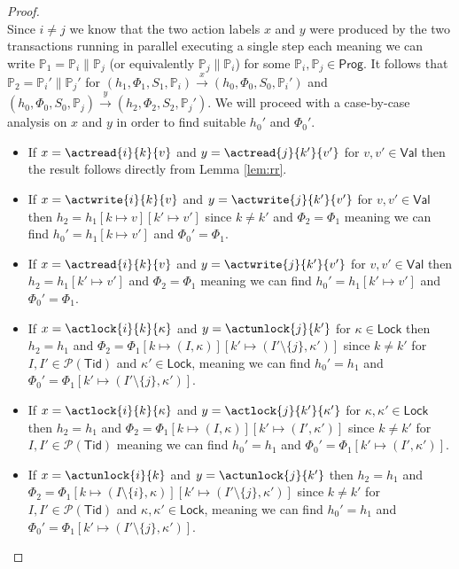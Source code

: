 \begin{lem}
\begin{proof}
\[	\]
	Since $i \neq j$ we know that the two action labels $x$ and $y$ were produced by the two transactions running in parallel executing a single step each meaning we can write $\mathds{P}_1 = \mathds{P}_i \| \mathds{P}_j$ (or equivalently $\mathds{P}_j \| \mathds{P}_i$) for some $\mathds{P}_i, \mathds{P}_j \in \mathsf{Prog}$. It follows that $\mathds{P}_2 = \mathds{P}_i' \| \mathds{P}_j'$ for $(h_1, \Phi_1, S_1, \mathds{P}_i) \xrightarrow{x} (h_0, \Phi_0, S_0, \mathds{P}_i')$ and $(h_0, \Phi_0, S_0, \mathds{P}_j) \xrightarrow{y} (h_2, \Phi_2, S_2, \mathds{P}_j')$. We will proceed with a case-by-case analysis on $x$ and $y$ in order to find suitable $h_0'$ and $\Phi_0'$.
	\begin{itemize}
		\item If $x = \actread{i}{k}{v}$ and $y = \actread{j}{k'}{v'}$ for $v, v' \in \mathsf{Val}$ then the result follows directly from Lemma \ref{lem:rr}.
		
		\item If $x = \actwrite{i}{k}{v}$ and $y = \actwrite{j}{k'}{v'}$ for $v, v' \in \mathsf{Val}$ then $h_2 = h_1[k \mapsto v][k' \mapsto v']$ since $k \neq k'$ and $\Phi_2 = \Phi_1$ meaning we can find $h_0' = h_1[k \mapsto v']$ and $\Phi_0' = \Phi_1$.
		
		\item If $x = \actread{i}{k}{v}$ and $y = \actwrite{j}{k'}{v'}$ for $v, v' \in \mathsf{Val}$ then $h_2 = h_1[k' \mapsto v']$ and $\Phi_2 = \Phi_1$ meaning we can find $h_0' = h_1[k' \mapsto v']$ and $\Phi_0' = \Phi_1$.
		
		\item If $x = \actlock{i}{k}{\kappa}$ and $y = \actunlock{j}{k'}$ for $\kappa \in \mathsf{Lock}$ then $h_2 = h_1$ and $\Phi_2 = \Phi_1[k \mapsto (I, \kappa)][k' \mapsto (I' \setminus \{j\}, \kappa')]$ since $k \neq k'$ for $I, I' \in \mathcal{P}(\mathsf{Tid})$ and $\kappa' \in \mathsf{Lock}$, meaning we can find $h_0' = h_1$ and $\Phi_0' = \Phi_1[k' \mapsto (I' \setminus \{j\}, \kappa')]$.
		
		\item If $x = \actlock{i}{k}{\kappa}$ and $y = \actlock{j}{k'}{\kappa'}$ for $\kappa, \kappa' \in \mathsf{Lock}$ then $h_2 = h_1$ and $\Phi_2 = \Phi_1[k \mapsto (I, \kappa)][k' \mapsto (I', \kappa')]$ since $k \neq k'$ for $I, I' \in \mathcal{P}(\mathsf{Tid})$ meaning we can find $h_0' = h_1$ and $\Phi_0' = \Phi_1[k' \mapsto (I', \kappa')]$.
		
		\item If $x = \actunlock{i}{k}$ and $y = \actunlock{j}{k'}$ then $h_2 = h_1$ and $\Phi_2 = \Phi_1[k \mapsto (I \setminus \{i\}, \kappa)][k' \mapsto (I' \setminus \{j\}, \kappa')]$ since $k \neq k'$ for $I, I' \in \mathcal{P}(\mathsf{Tid})$ and $\kappa, \kappa' \in \mathsf{Lock}$, meaning we can find $h_0' = h_1$ and $\Phi_0' = \Phi_1[k' \mapsto (I' \setminus \{j\}, \kappa')]$.
		

\end{itemize}
\end{proof}
\end{lem}
